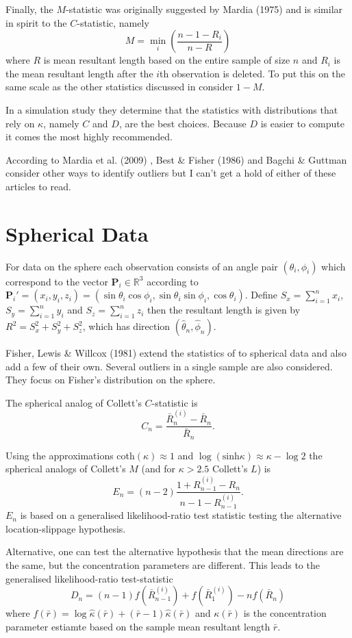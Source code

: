 \documentclass{article}\usepackage{graphicx, color}
\newcommand{\R}{{\mathbb{R}}}
\begin{document}
Finally, the $M$-statistic was originally suggested by Mardia (1975) \cite{mardia1975} and is similar in spirit to the $C$-statistic, namely
\[
M=\min_i\left(\frac{n-1-R_i}{n-R}\right)
\]
where $R$ is mean resultant length based on the entire sample of size $n$ and $R_i$ is the mean resultant length after the $i$th observation is deleted.  To put this on the same scale as the other statistics discussed in \cite{collett1980} consider $1-M$.

In a simulation study they determine that the statistics with distributions that rely on $\kappa$, namely $C$ and $D$, are the best choices.  Because $D$ is easier to compute it comes the most highly recommended.

According to Mardia et al. (2009) \cite{mardia2009},  Best \& Fisher (1986) \cite{best1986} and Bagchi \& Guttman \cite{bagchi1990} consider other ways to identify outliers but I can't get a hold of either of these articles to read.

\section{Spherical Data}

For data on the sphere each observation consists of an angle pair $(\theta_i,\phi_i)$ which correspond to the vector $\bm P_i\in \R^3$ according to $\bm P_i'=(x_i,y_i,z_i)=(\sin\theta_i\cos\phi_i,\sin\theta_i\sin\phi_i,\cos\theta_i)$.  Define $S_x=\sum_{i=1}^nx_i$, $S_y=\sum_{i=1}^ny_i$ and $S_z=\sum_{i=1}^nz_i$ then the resultant length is given by $R^2=S_x^2+S_y^2+S_z^2$, which has direction $(\hat\theta_n,\hat\phi_n)$.

Fisher, Lewis \& Willcox (1981) \cite{fisher1981} extend the statistics of \cite{collett1980} to spherical data and also add a few of their own.  Several outliers in a single sample are also considered.  They focus on Fisher's distribution on the sphere.

The spherical analog of Collett's $C$-statistic is
\[
C_n=\frac{\bar{R}_n^{(i)}-\bar{R}_n}{\bar{R}_n}.
\]

Using the approximations coth$(\kappa)\approx 1$ and $\log(\text{sinh}\kappa)\approx\kappa-\log 2$ the spherical analogs of Collett's $M$ (and for $\kappa>2.5$ Collett's $L$) is 
\[
E_n=(n-2)\frac{1+R_{n-1}^{(i)}-R_n}{n-1-R_{n-1}^{(i)}}.
\]
$E_n$ is based on a generalised likelihood-ratio test statistic testing the alternative location-slippage hypothesis.

Alternative, one can test the alternative hypothesis that the mean directions are the same, but the concentration parameters are different.  This leads to the generalised likelihood-ratio test-statistic
\[
D_n=(n-1)f(\bar{R}_{n-1}^{(i)})+f(\bar{R}_1^{(i)})-nf(\bar{R}_n)
\]
where $f(\bar{r})=\log\hat\kappa(\bar{r})+(\bar{r}-1)\hat\kappa(\bar{r})$ and $\kappa(\bar{r})$ is the concentration parameter estiamte based on the sample mean resultant length $\bar{r}$.
\end{document}
